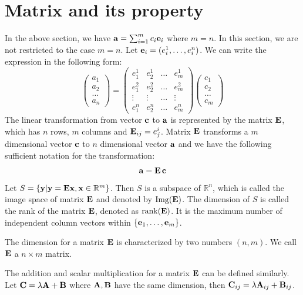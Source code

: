 \section{Matrix and its property}
In the above section, we have $\mathbf{a} = \sum_{i=1}^m c_i \mathbf{e}_i$ where $m=n$. In this section, we are not restricted to the case $m=n$. Let $\mathbf{e}_i = (e_i^1, \dots, e_i^n)$. We can write the expression in the following form:
\begin{equation}
	\begin{pmatrix} a_1 \\ a_2 \\ \dots \\ a_n \end{pmatrix}
	 = \begin{pmatrix} e^1_1 & e^1_2 & \dots & e^1_m \\ e^2_1 & e^2_2 & \dots & e^2_m \\ 
	 	\vdots & \vdots & \dots & \vdots \\
	 	 e^n_1 & e^n_2 & \dots & e^n_m \end{pmatrix} \begin{pmatrix} c_1 \\ c_2 \\ \dots \\ c_m \end{pmatrix}
\end{equation}
The linear transformation from vector $\mathbf{c}$ to $\mathbf{a}$ is represented by the matrix $\mathbf{E}$, which has $n$ rows, $m$ columns and $\mathbf{E}_{ij} = e^i_j$.
Matrix $\mathbf{E}$ transforms a $m$ dimensional vector $\mathbf{c}$ to $n$ dimensional vector $\mathbf{a}$ and 
we have the following sufficient notation for the transformation:
\begin{equation}
\mathbf{a} = \mathbf{E}\, \mathbf{c}
\end{equation}
Let $S=\{\mathbf{y} | \mathbf{y} = \mathbf{E}\mathbf{x}, \mathbf{x} \in \mathbb{R}^m\}$. Then $S$ is a subspace of $\mathbb{R}^n$, which is called the image space of matrix $\mathbf{E}$ and denoted by $\mathrm{Img}(\mathbf{E})$. The dimension of $S$ is called the rank of the matrix $\mathbf{E}$, denoted as $\mathrm{rank}(\mathbf{E})$. It is the maximum number of independent column vectors within $\{\mathbf{e}_1, \dots, \mathbf{e}_m\}$.

The dimension for a matrix $\mathbf{E}$ is characterized by two numbers $(n,m)$. We call $\mathbf{E}$  a $n\times m$ matrix.

The addition and scalar multiplication for a matrix $\mathbf{E}$ can be defined similarly. Let $\mathbf{C} = \lambda \mathbf{A} + \mathbf{B}$ where $\mathbf{A}, \mathbf{B}$ have the same dimension, then $\mathbf{C}_{ij} = \lambda \mathbf{A}_{ij} + \mathbf{B}_{ij}$.


